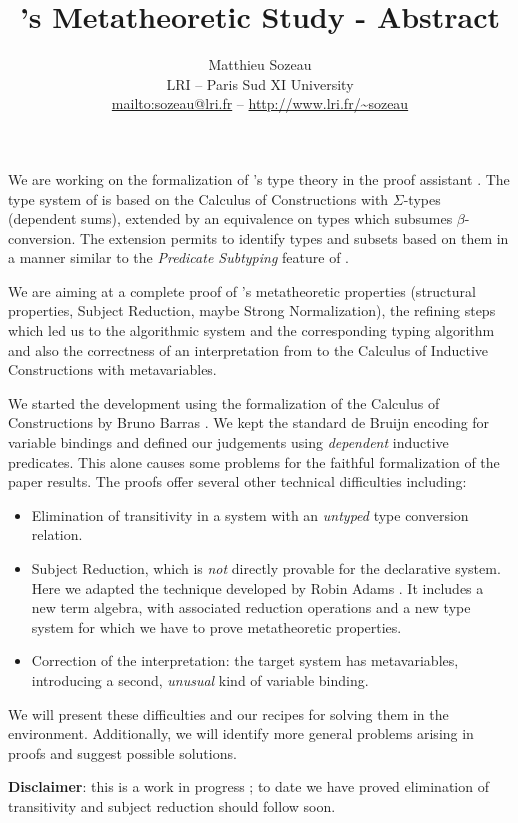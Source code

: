 \documentclass{article}
\title{\Russell's Metatheoretic Study - Abstract}
\date{}
\author{Matthieu Sozeau \\
  LRI -- Paris Sud XI University \\
  \url{mailto:sozeau@lri.fr} -- \url{http://www.lri.fr/~sozeau}}
\begin{document}
\maketitle
\thispagestyle{empty}

We are working on the formalization of \Russell{}'s type theory in the
\Coq{} proof assistant \cite{sozeau:coq/Russell/meta}.  The type system
of \Russell{} is based on the Calculus of Constructions with
$\Sigma$-types (dependent sums), extended by an equivalence on types
which subsumes $\beta$-conversion. The extension permits to identify
types and subsets based on them in a manner similar to the
\emph{Predicate Subtyping} feature of \PVS{}.

We are aiming at a complete proof of \Russell{}'s metatheoretic properties
(structural properties, Subject Reduction, maybe Strong Normalization),
the refining steps which led us to the algorithmic system and the
corresponding typing algorithm and also the correctness of an interpretation
from \Russell{} to the Calculus of Inductive Constructions with
metavariables.

We started the development using the formalization of the Calculus of
Constructions by Bruno Barras \cite{Barras96a}.  We kept the standard de
Bruijn encoding for variable bindings and defined our judgements using
\emph{dependent} inductive predicates.  This alone causes some problems
for the faithful formalization of the paper results.  The proofs offer
several other technical difficulties including:
\begin{itemize}
\item Elimination of transitivity in a system with an \emph{untyped} type
  conversion relation.

\item Subject Reduction, which is \emph{not} directly provable for the
  declarative system. Here we adapted the technique developed by
  Robin Adams \cite{adams:PTSEQ}. It includes a new term algebra, with
  associated reduction operations and a new type system
  for which we have to prove metatheoretic properties.

\item Correction of the interpretation: the target system has
  metavariables, introducing a second, \emph{unusual} kind of variable
  binding.
\end{itemize}

We will present these difficulties and our recipes for solving them in
the \Coq environment. Additionally, we will identify more general
problems arising in \Coq proofs and suggest possible solutions. 

{\bf Disclaimer}: this is a work in
progress ; to date we have proved elimination of transitivity and
subject reduction should follow soon.



\end{document}
